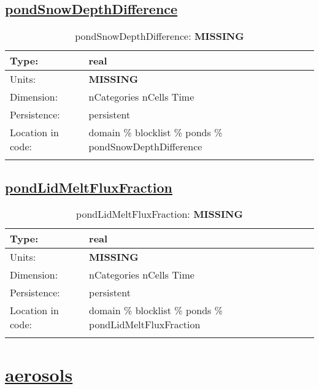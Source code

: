 \subsection[pondSnowDepthDifference]{\hyperref[sec:var_tab_ponds]{pondSnowDepthDifference}}
\label{subsec:var_sec_ponds_pondSnowDepthDifference}
\begin{center}
\begin{longtable}{| p{2.0in} | p{4.0in} |}
        \hline 
        Type: & real \\
        \hline 
        Units: & {\bf \color{red} MISSING} \\
        \hline 
        Dimension: & nCategories nCells Time \\
        \hline 
        Persistence: & persistent \\
        \hline 
         Location in code: & domain \% blocklist \% ponds \% pondSnowDepthDifference \\
         \hline 
    \caption{pondSnowDepthDifference: {\bf \color{red} MISSING}}
\end{longtable}
\end{center}
\subsection[pondLidMeltFluxFraction]{\hyperref[sec:var_tab_ponds]{pondLidMeltFluxFraction}}
\label{subsec:var_sec_ponds_pondLidMeltFluxFraction}
\begin{center}
\begin{longtable}{| p{2.0in} | p{4.0in} |}
        \hline 
        Type: & real \\
        \hline 
        Units: & {\bf \color{red} MISSING} \\
        \hline 
        Dimension: & nCategories nCells Time \\
        \hline 
        Persistence: & persistent \\
        \hline 
         Location in code: & domain \% blocklist \% ponds \% pondLidMeltFluxFraction \\
         \hline 
    \caption{pondLidMeltFluxFraction: {\bf \color{red} MISSING}}
\end{longtable}
\end{center}
\section[aerosols]{\hyperref[sec:var_tab_aerosols]{aerosols}}
\label{sec:var_sec_aerosols}
